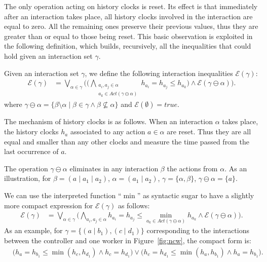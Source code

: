 \documentclass{LMCS}
\newcommand{\actions}{\mathit{Act}}
\newcommand{\eqs}{\mathcal{E}}
\newcommand{\true}{\mathit{true}\xspace}
\theoremstyle{plain}\newtheorem{remark}[thm]{Remark}
\theoremstyle{plain}\newtheorem{example}[thm]{Example}
\begin{document}
The only operation acting on history clocks is reset. Its effect is
that immediately after an interaction takes place, all history clocks
involved in the interaction are equal to zero. All the remaining ones
preserve their previous values, thus they are greater than or equal to
those being reset. This basic observation is exploited in the
following definition, which builds, recursively, all the inequalities
that could hold given an interaction set $\gamma$.

\begin{defi}
\label{def:eqs}
Given an interaction set $\gamma$, we define the following
interaction inequalities $\eqs(\gamma)$:
\begin{align*}
  \eqs(\gamma) & = \displaystyle{\bigvee_{\alpha \in \gamma}}
  \Big(\displaystyle{\big(\bigwedge_{\substack{a_i, a_j \in \alpha \\ a_k
        \in \actions(\gamma \ominus \alpha)}}} h_{a_i} = h_{a_j} \leq h_{a_k}
  \big) \wedge \eqs(\gamma\ominus\alpha) \Big).
\end{align*}
where $\gamma\ominus\alpha = \{\beta \setminus \alpha \;|\; \beta \in
\gamma \wedge \beta \not\subseteq \alpha \}$ and $\eqs(\emptyset)=\true$.
\end{defi}

The mechanism of history clocks is as follows. When an interaction
$\alpha$ takes place, the history clocks $h_a$ associated to any
action $a \in \alpha$ are reset. Thus they are all equal and smaller
than any other clocks and measure the time passed from the last
occurrence of $a$.

The operation $\gamma \ominus \alpha$ eliminates in any interaction
$\beta$ the actions from $\alpha$. As an illustration, for $\beta =
(a \mid a_1 \mid a_2)$, $\alpha = (a_1 \mid a_2)$, $\gamma = \{\alpha,
\beta\}$, $\gamma \ominus \alpha = \{a\}$. 



We can use the interpreted function ``$\min$'' as syntactic sugar to have a
slightly more compact expression for $\eqs(\gamma)$ as follows:
\begin{align*}
  \eqs(\gamma) & = \displaystyle{\bigvee_{\alpha \in \gamma}}
  \Big(\displaystyle{\bigwedge_{a_i,a_j \in \alpha}} h_{a_i} = h_{a_j} \leq
  \displaystyle{\min\limits_{a_k \in \actions(\gamma \ominus \alpha)}}h_{a_k} \wedge
  \eqs(\gamma\ominus\alpha)\Big). 
\end{align*} 
As an example, for $\gamma = \{(a\mid b_1), (c\mid d_1)\}$ corresponding to
the interactions between the controller and one worker in
Figure~\ref{fig:ncw}, the compact form is:
\begin{align*}
& \big(h_{a} = h_{b_1} \leq \min(h_c, h_{d_1}) \wedge h_c = h_{d_1}\big) \vee \big(h_{c}=h_{d_1}\leq \min(h_a, h_{b_1}) \wedge h_a = h_{b_1} \big).
\end{align*}
\end{document}
